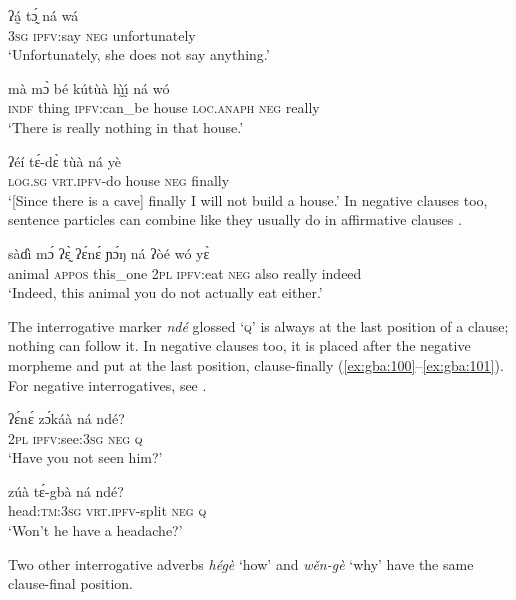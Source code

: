 \documentclass[output=paper,colorlinks=true, citecolor=brown]{langscibook}
\begin{document}
\ea\label{ex:gba:96}
    \gll ʔá̰  tɔ̰́ ná wá \\ 
         3\textsc{sg} \textsc{ipfv}:say \textsc{neg} unfortunately \\
    \glt ‘Unfortunately, she does not say anything.’
\z 
 
\ea\label{ex:gba:97}
    \gll mà mɔ̀ bé kútùà h\`{ı̰}\'{ı̰}  ná wó \\ 
         \textsc{indf} thing \textsc{ipfv}:can\_be house \textsc{loc.anaph} \textsc{neg} really \\
    \glt ‘There is really nothing in that house.’
\z 

\ea\label{ex:gba:98}
    \gll ʔéí tɛ́-dɛ̀ tùà ná yè \\ 
         \textsc{log.sg} \textsc{vrt.ipfv}-do house \textsc{neg} finally \\
    \glt ‘[Since there is a cave] finally I will not build a house.’
\z 
In negative clauses too, sentence particles can combine like they usually do in affirmative clauses .

\ea\label{ex:gba:99}
    \gll sàɗì mɔ́ ʔɛ̰̀ ʔɛ́nɛ́ ɲɔ́ŋ ná ʔòé wó yɛ̀ \\ 
         animal \textsc{appos} this\_one 2\textsc{pl} \textsc{ipfv}:eat \textsc{neg} also really indeed \\
    \glt ‘Indeed, this animal you do not actually eat either.’
\z 

The interrogative marker \textit{ndé} glossed ‘\textsc{q}’ is always at the last position of a clause; nothing can follow it. In negative clauses too, it is placed after the negative morpheme and put at the last position, clause-finally (\ref{ex:gba:100}--\ref{ex:gba:101}). For negative interrogatives, see . 

\ea\label{ex:gba:100}
    \gll ʔɛ́nɛ́ zɔ́káà ná ndé? \\ 
         2\textsc{pl} \textsc{ipfv}:see:3\textsc{sg} \textsc{neg} \textsc{q} \\
    \glt ‘Have you not seen him?’
\z 

\ea\label{ex:gba:101}
    \gll zúà tɛ́-gbà ná ndé? \\ 
         head:\textsc{tm}:3\textsc{sg} \textsc{vrt.ipfv}-split \textsc{neg} \textsc{q} \\
    \glt ‘Won't he have a headache?’
\z 
 
Two other interrogative adverbs \textit{hégè} ‘how’  and \textit{wěn-gè} ‘why’ have the same clause-final position.
\end{document}
